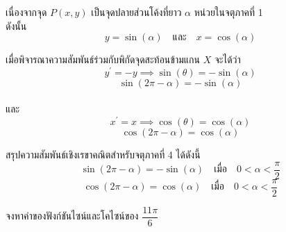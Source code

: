 \vspace{0.5em}
\noindent เนื่องจากจุด $P(x, y)$ เป็นจุดปลายส่วนโค้งที่ยาว $\alpha$ หน่วยในจตุภาคที่ 1
\\
ดังนั้น 
$$y = \sin(\alpha) \quad \text{และ} \quad x = \cos(\alpha)$$

\vspace{0.3em}
\noindent เมื่อพิจารณาความสัมพันธ์ร่วมกับพิกัดจุดสะท้อนข้ามแกน $X$ จะได้ว่า
$$y^{\prime} = -y \implies \sin(\theta) = -\sin(\alpha)$$
$$\sin(2\pi - \alpha) = -\sin(\alpha)$$
\\[0.3em]
และ
$$x^{\prime} = x \implies \cos(\theta) = \cos(\alpha)$$
$$\cos(2\pi - \alpha) = \cos(\alpha)$$

\begin{remarkbox}
	สรุปความสัมพันธ์เชิงเรขาคณิตสำหรับจตุภาคที่ 4 ได้ดังนี้
	$$\sin(2\pi - \alpha) = -\sin(\alpha) \quad \text{เมื่อ} \quad 0 < \alpha < \dfrac{\pi}{2}$$
	$$\cos(2\pi - \alpha) = \cos(\alpha) \quad \text{เมื่อ} \quad 0 < \alpha < \dfrac{\pi}{2}$$
\end{remarkbox}

\begin{examplebox}
จงหาค่าของฟังก์ชันไซน์และโคไซน์ของ $\dfrac{11 \pi}{6}$
\end{examplebox}
\solution

\newpage
